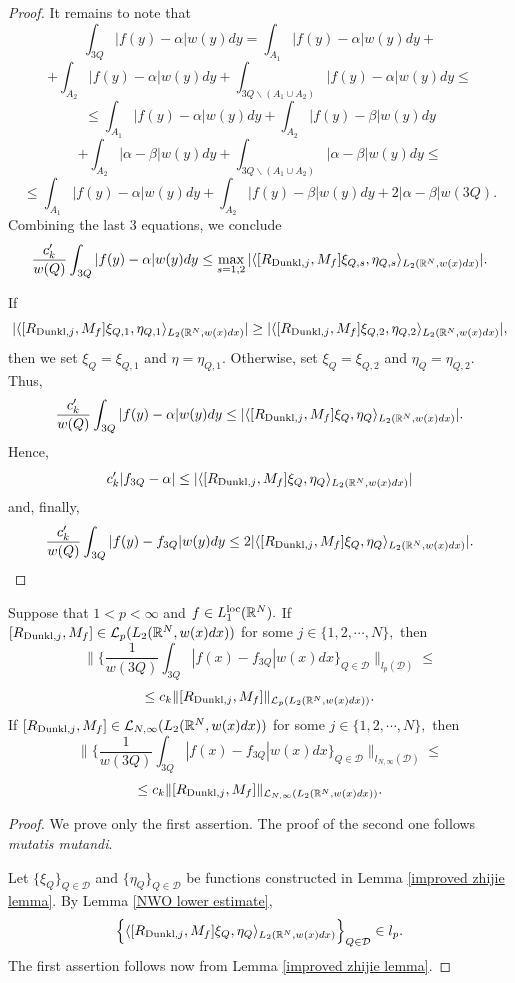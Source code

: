 \documentclass{amsart}
\numberwithin{equation}{section}
\begin{document}
\begin{proof}
It remains to note that
$$\int_{3Q}|f(y)-\alpha|w(y)dy=\int_{A_1}|f(y)-\alpha|w(y)dy+$$
$$+\int_{A_2}|f(y)-\alpha|w(y)dy+\int_{3Q\backslash(A_1\cup A_2)}|f(y)-\alpha|w(y)dy\leq$$
$$\leq\int_{A_1}|f(y)-\alpha|w(y)dy+\int_{A_2}|f(y)-\beta|w(y)dy$$
$$+\int_{A_2}|\alpha-\beta|w(y)dy+\int_{3Q\backslash(A_1\cup A_2)}|\alpha-\beta|w(y)dy\leq$$
$$\leq\int_{A_1}|f(y)-\alpha|w(y)dy+\int_{A_2}|f(y)-\beta|w(y)dy+2|\alpha-\beta|w(3Q).$$
Combining the last $3$ equations, we conclude
$$\frac{c_k'}{w(Q)}\int_{3Q}|f(y)-\alpha|w(y)dy\leq\max_{s=1,2}|\langle[R_{{\rm Dunkl},j},M_f]\xi_{Q,s},\eta_{Q,s}\rangle_{L_2(\mathbb{R}^N,w(x)dx)}|.$$

If
$$|\langle[R_{{\rm Dunkl},j},M_f]\xi_{Q,1},\eta_{Q,1}\rangle_{L_2(\mathbb{R}^N,w(x)dx)}|\geq |\langle[R_{{\rm Dunkl},j},M_f]\xi_{Q,2},\eta_{Q,2}\rangle_{L_2(\mathbb{R}^N,w(x)dx)}|,$$
then we set $\xi_Q=\xi_{Q,1}$ and $\eta=\eta_{Q,1}.$ Otherwise, set $\xi_Q=\xi_{Q,2}$ and $\eta_Q=\eta_{Q,2}.$ Thus,
$$\frac{c_k'}{w(Q)}\int_{3Q}|f(y)-\alpha|w(y)dy\leq|\langle[R_{{\rm Dunkl},j},M_f]\xi_Q,\eta_Q\rangle_{L_2(\mathbb{R}^N,w(x)dx)}|.$$
Hence,
$$c_k'|f_{3Q}-\alpha|\leq|\langle[R_{{\rm Dunkl},j},M_f]\xi_Q,\eta_Q\rangle_{L_2(\mathbb{R}^N,w(x)dx)}|$$
and, finally,
$$\frac{c_k'}{w(Q)}\int_{3Q}|f(y)-f_{3Q}|w(y)dy\leq 2|\langle[R_{{\rm Dunkl},j},M_f]\xi_Q,\eta_Q\rangle_{L_2(\mathbb{R}^N,w(x)dx)}|.$$
\end{proof}

\begin{lemma}\label{standard} Suppose that $1<p<\infty$ and $f\in L_1^{{\rm loc}}(\mathbb{R}^N).$ If $[R_{{\rm Dunkl},j},M_f]\in\mathcal{L}_p(L_2(\mathbb{R}^N,w(x)dx))$ for some $j\in\{1,2,\cdots,N\},$ then
$$\Big\|\Big\{\frac1{w(3Q)}\int_{3Q}|f(x)-f_{3Q}|w(x)dx\Big\}_{Q\in\mathcal{D}}\Big\|_{l_p(\mathcal{D})}\leq$$
$$\leq c_k\|[R_{{\rm Dunkl},j},M_f]\|_{\mathcal{L}_p(L_2(\mathbb{R}^N,w(x)dx))}.$$
If $[R_{{\rm Dunkl},j},M_f]\in\mathcal{L}_{N,\infty}(L_2(\mathbb{R}^N,w(x)dx))$ for some $j\in\{1,2,\cdots,N\},$ then
$$\Big\|\Big\{\frac1{w(3Q)}\int_{3Q}|f(x)-f_{3Q}|w(x)dx\Big\}_{Q\in\mathcal{D}}\Big\|_{l_{N,\infty}(\mathcal{D})}\leq$$
$$\leq c_k\|[R_{{\rm Dunkl},j},M_f]\|_{\mathcal{L}_{N,\infty}(L_2(\mathbb{R}^N,w(x)dx))}.$$
\end{lemma}
\begin{proof} We prove only the first assertion. The proof of the second one follows {\it mutatis mutandi}.

Let $\{\xi_Q\}_{Q\in\mathcal{D}}$ and $\{\eta_Q\}_{Q\in\mathcal{D}}$ be functions constructed in Lemma \ref{improved zhijie lemma}. By Lemma \ref{NWO lower estimate},
$$\Big\{\langle [R_{{\rm Dunkl},j},M_f]\xi_Q,\eta_Q\rangle_{L_2(\mathbb{R}^N,w(x)dx)}\Big\}_{Q\in\mathcal{D}}\in l_p.$$
The first assertion follows now from Lemma \ref{improved zhijie lemma}.
\end{proof}
\end{document}
